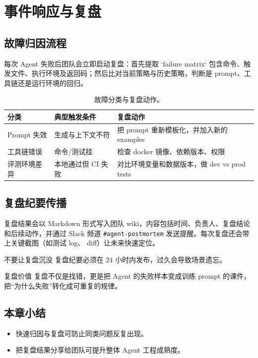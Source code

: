 \section{事件响应与复盘}
\subsection{故障归因流程}
每次 Agent 失败后团队会立即启动复盘：首先提取 `failure matrix` 包含命令、触发文件、执行环境及返回码；然后比对当前策略与历史策略，判断是 prompt、工具链还是运行环境的回归。

\begin{table}[H]
\centering
\begin{tabular}{p{} p{} p{}}
\toprule
分类 & 典型触发条件 & 复盘动作 \\
\midrule
Prompt 失效 & 生成与上下文不符 & 把 prompt 重新模板化，并加入新的 examples \\
\midrule
工具链错误 & 命令/测试挂 & 检查 docker 镜像、依赖版本、权限 \\
\midrule
评测环境差异 & 本地通过但 CI 失败 & 对比环境变量和数据版本，做 dev vs prod tests \\
\bottomrule
\end{tabular}
\caption{故障分类与复盘动作。}
\end{table}

\subsection{复盘纪要传播}
复盘结果会以 Markdown 形式写入团队 wiki，内容包括时间、负责人、复盘结论和后续动作，并通过 Slack 频道 \texttt{\#agent-postmortem} 发送提醒。每次复盘还会带上关键截图（如测试 log、 diff）让未来快速定位。

\begin{warningbox}{不要让复盘沉没}
复盘纪要必须在 24 小时内发布，过久会导致场景遗忘。
\end{warningbox}

\begin{knowledgebox}{复盘价值}
复盘不仅是找错，更是把 Agent 的失败样本变成训练 prompt 的课件，把“为什么失败”转化成可重复的规律。
\end{knowledgebox}

\subsection{本章小结}
\begin{itemize}
    \item 快速归因与复盘可防止同类问题反复出现。
    \item 把复盘结果分享给团队可提升整体 Agent 工程成熟度。
\end{itemize}

